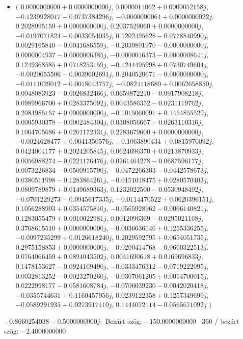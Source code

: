 \documentclass[14pt,a4paper]{article}
\begin{document}
\begin{itemize}
\item
$\big($
$0.0000000000+0.0000000000j$, $0.0000011062+0.0000052158j$, $-0.1239928017-0.0737384296j$, $-0.0000000064+0.0000000022j$, $0.2028995159+0.0000000000j$, $0.2037529060+0.0000000000j$, $-0.0197071824-0.0033054035j$, $0.1202495628-0.0778840990j$, $0.0029165840-0.0041686559j$, $-0.2039891970-0.0000000000j$, $0.0000004937-0.0000006385j$, $-0.0000016373-0.0000008641j$, $0.1249368585+0.0718253159j$, $-0.1244495998+0.0730749604j$, $-0.0020655506-0.0039602691j$, $0.2040520671-0.0000000000j$, $-0.0111039012-0.0018043757j$, $-0.0824118680+0.0062658850j$, $0.0048083923-0.0026832466j$, $0.0659872210-0.0917908218j$, $0.0989966700+0.0283375092j$, $0.0043586352-0.0231119762j$, $0.2084985157+0.0000000000j$, $-0.1015060091+0.1454855529j$, $0.0005930378-0.0002484304j$, $0.0308056667-0.0263110316j$, $0.1064705686+0.0201172331j$, $0.2283679600+0.0000000000j$, $-0.0024628477+0.0041350576j$, $-0.1063890434+0.0815970092j$, $0.0424004177+0.2024205845j$, $0.0624696370+0.0213870933j$, $0.0056988274-0.0221176476j$, $0.0261464278-0.0687596177j$, $0.0073226834-0.0500915790j$, $-0.0472266303-0.0442578673j$, $0.0380511998-0.1283864261j$, $-0.0151018475+0.0280570403j$, $0.0809789879+0.0149689363j$, $0.1232022500-0.0530948492j$, $-0.0701229273-0.0945617335j$, $-0.0114470522+0.0620396151j$, $0.1056288903+0.0354575840j$, $-0.0565928962-0.0066140821j$, $0.1283055479+0.0010022981j$, $0.0012096369-0.0295021168j$, $0.3768615510+0.0000000000j$, $-0.0036636146+0.1255336255j$, $-0.0097235299+0.0126618240j$, $0.2029592795+0.0654051735j$, $0.2975158853+0.0000000000j$, $-0.0200414768-0.0660322513j$, $0.0764066459+0.0894043502j$, $0.0041690618+0.0169696833j$, $0.1478153627-0.0924109490j$, $-0.0333476312-0.0719222095j$, $0.0032813252-0.0023270260j$, $-0.0307061205+0.0014700015j$, $0.0222998177-0.0581608784j$, $-0.0706039230-0.0042020418j$, $-0.0355744631+0.1160457956j$, $0.0239122358+0.1257349699j$, $-0.0589291935+0.0273917410j$, $0.1444072114-0.0565671092j$
$\big)$
\end{itemize}
$-0.8660254038-0.5000000000j$:\
Bezárt szög: $-150.0000000000$ \
360 / bezárt szög: $-2.4000000000$\
\end{document}
